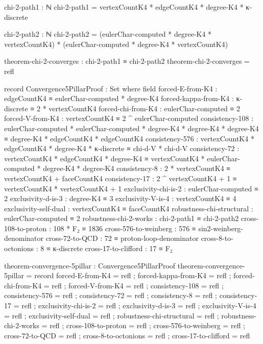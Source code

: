 \documentclass[11pt,a4paper]{book}
\begin{document}
\begin{code}
chi-2-path1 : ℕ
chi-2-path1 = vertexCountK4 * edgeCountK4 * degree-K4 * κ-discrete

chi-2-path2 : ℕ
chi-2-path2 = (eulerChar-computed * degree-K4 * vertexCountK4) * (eulerChar-computed * degree-K4 * vertexCountK4)

theorem-chi-2-converges : chi-2-path1 ≡ chi-2-path2
theorem-chi-2-converges = refl


record Convergence5PillarProof : Set where
  field
    forced-E-from-K4      : edgeCountK4 ≡ eulerChar-computed * degree-K4
    forced-kappa-from-K4  : κ-discrete ≡ 2 * vertexCountK4
    forced-chi-from-K4    : eulerChar-computed ≡ 2
    forced-V-from-K4      : vertexCountK4 ≡ 2 ^ eulerChar-computed
    consistency-108 : eulerChar-computed * eulerChar-computed * degree-K4 * degree-K4 * degree-K4 
                    ≡ degree-K4 * edgeCountK4 * edgeCountK4
    consistency-576 : vertexCountK4 * edgeCountK4 * degree-K4 * κ-discrete 
                    ≡ chi-d-V * chi-d-V
    consistency-72  : vertexCountK4 * edgeCountK4 * degree-K4 
                    ≡ vertexCountK4 * eulerChar-computed * degree-K4 * degree-K4
    consistency-8   : 2 * vertexCountK4 ≡ vertexCountK4 + faceCountK4
    consistency-17  : 2 ^ vertexCountK4 + 1 ≡ vertexCountK4 * vertexCountK4 + 1
    exclusivity-chi-is-2      : eulerChar-computed ≡ 2
    exclusivity-d-is-3        : degree-K4 ≡ 3
    exclusivity-V-is-4        : vertexCountK4 ≡ 4
    exclusivity-self-dual     : vertexCountK4 ≡ faceCountK4
    robustness-chi-structural : eulerChar-computed ≡ 2
    robustness-chi-2-works    : chi-2-path1 ≡ chi-2-path2
    cross-108-to-proton : 108 * F₂ ≡ 1836
    cross-576-to-weinberg : 576 ≡ sin2-weinberg-denominator
    cross-72-to-QCD : 72 ≡ proton-loop-denominator
    cross-8-to-octonions : 8 ≡ κ-discrete
    cross-17-to-clifford : 17 ≡ F₂

theorem-convergence-5pillar : Convergence5PillarProof
theorem-convergence-5pillar = record
  { forced-E-from-K4 = refl
  ; forced-kappa-from-K4 = refl
  ; forced-chi-from-K4 = refl
  ; forced-V-from-K4 = refl
  ; consistency-108 = refl
  ; consistency-576 = refl
  ; consistency-72 = refl
  ; consistency-8 = refl
  ; consistency-17 = refl
  ; exclusivity-chi-is-2 = refl
  ; exclusivity-d-is-3 = refl
  ; exclusivity-V-is-4 = refl
  ; exclusivity-self-dual = refl
  ; robustness-chi-structural = refl
  ; robustness-chi-2-works = refl
  ; cross-108-to-proton = refl
  ; cross-576-to-weinberg = refl
  ; cross-72-to-QCD = refl
  ; cross-8-to-octonions = refl
  ; cross-17-to-clifford = refl
  }


\end{code}
\end{document}
